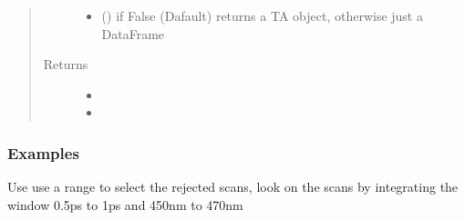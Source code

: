 \documentclass[letterpaper,10pt,english]{sphinxmanual}
\begin{document}
\begin{fulllineitems}
\begin{quote}
\begin{description}
\begin{itemize}
\item {} 
 (\sphinxstyleliteralemphasis{\sphinxupquote{,}}\sphinxstyleliteralemphasis{\sphinxupquote{(}}\sphinxstyleliteralemphasis{\sphinxupquote{)}}) \textendash{} if False (Dafault) returns a TA object, otherwise just a DataFrame

\end{itemize}

\item[{Returns}] \leavevmode
\begin{itemize}
\item {} 

\item {} 

\end{itemize}


\end{description}\end{quote}
\subsubsection*{Examples}

Use use a range to select the rejected scans, look on the scans by integrating the window 0.5ps to 1ps and 450nm to 470nm


\end{fulllineitems}
\end{document}
